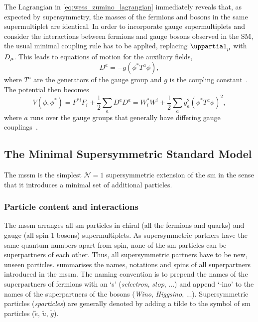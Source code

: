 The Lagrangian in \cref{eq:wess_zumino_lagrangian} immediately reveals that, as expected by supersymmetry, the masses of the fermions and bosons in the same supermultiplet are identical. In order to incorporate gauge supermultiplets and consider the interactions between fermions and gauge bosons observed in the SM, the usual minimal coupling rule has to be applied, replacing $\uppartial_\mu$ with $\mathop{}\!D_\mu$. This leads to equations of motion for the auxiliary fields,
\begin{equation}
	D^a = -g(\phi^*T^a\phi),
\end{equation}
where $T^a$ are the generators of the gauge group and $g$ is the coupling constant~\cite{Bustamante:2009us}. The potential then becomes
\begin{equation}
	V(\phi,\phi^*) = F^{*i}F_i + \frac{1}{2} \sum_a{D^aD^a} = W^*_iW^i + \frac{1}{2}\sum_a{g^2_a(\phi^*T^a\phi)^2} ,
\end{equation}
where $a$ runs over the gauge groups that generally have differing gauge couplings~\cite{Bustamante:2009us}.


 
\subsection{The Minimal Supersymmetric Standard Model}\label{sec:mssm_intro}


The \gls{mssm} is the simplest $\mathcal{N}=1$ supersymmetric extension of the \gls{sm} in the sense that it introduces a minimal set of additional particles.

\subsubsection{Particle content and interactions}\label{sec:mssm_particle_content}

The \gls{mssm} arranges all \gls{sm} particles in chiral (all the fermions and quarks) and gauge (all spin-1 bosons) supermultiplets. As supersymmetric partners have the same quantum numbers apart from spin, none of the \gls{sm} particles can be superpartners of each other.
Thus, all supersymmetric partners have to be new, unseen particles.  summarises the names, notations and spins of all superpartners introduced in the \gls{mssm}.
The naming convention is to prepend the names of the superpartners of fermions with an `s' (\eg \textit{selectron}, \textit{stop}, ...) and append `-ino' to the names of the superpartners of the bosons (\eg \textit{Wino}, \textit{Higgsino}, ...).
Supersymmetric particles (\textit{sparticles}) are generally denoted by adding a tilde to the symbol of \gls{sm} particles (\eg $\tilde{e}$, $\tilde{u}$, $\tilde{g}$). 

